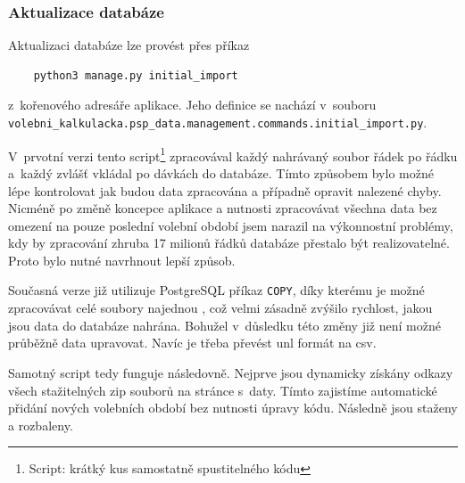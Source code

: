 \subsubsection{Aktualizace databáze}
Aktualizaci databáze lze provést přes příkaz
\begin{verbatim}
    python3 manage.py initial_import
\end{verbatim}
z~kořenového adresáře aplikace. Jeho definice se nachází v~souboru\\
\texttt{volebni\_kalkulacka.psp\_data.management.commands.initial\_import.py}. \\

\par V~prvotní verzi tento script\footnote{Script: krátký kus samostatně spustitelného kódu} zpracovával každý nahrávaný soubor řádek po řádku a~každý zvlášť vkládal po dávkách do databáze. Tímto způsobem bylo možné lépe kontrolovat jak budou data zpracována a případně opravit nalezené chyby. Nicméně po změně koncepce aplikace a nutnosti zpracovávat všechna data bez omezení na pouze poslední volební období jsem narazil na výkonnostní problémy, kdy by zpracování zhruba 17 milionů řádků databáze přestalo být realizovatelné.
Proto bylo nutné navrhnout lepší způsob.

\par Současná verze již utilizuje PostgreSQL příkaz \texttt{COPY}, díky kterému je možné zpracovávat celé soubory najednou \cite{psql-copy}, což velmi zásadně zvýšilo rychlost, jakou jsou data do databáze nahrána. Bohužel v~důsledku této změny již není možné průběžně data upravovat. Navíc je třeba převést unl formát na csv.

\par Samotný script tedy funguje následovně. Nejprve jsou dynamicky získány odkazy všech stažitelných zip souborů na stránce s~daty. Tímto zajistíme automatické přidání nových volebních období bez nutnosti úpravy kódu. Následně jsou staženy a rozbaleny. \\

